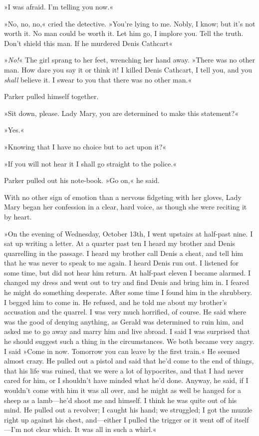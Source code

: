 »I was afraid. I'm telling you now.«

»No, no, no,« cried the detective. »You're lying to me. Nobly, I know; but it's not worth it. No man could be worth it. Let him go, I implore you. Tell the truth. Don't shield this man. If he murdered Denis Cathcart\longdash«

»\textit{No!}« The girl sprang to her feet, wrenching her hand away. »There was no other man. How dare you say it or think it! I killed Denis Cathcart, I tell you, and you \textit{shall} believe it. I swear to you that there was no other man.«

Parker pulled himself together.

»Sit down, please. Lady Mary, you are determined to make this statement?«

»Yes.«

»Knowing that I have no choice but to act upon it?«

»If you will not hear it I shall go straight to the police.«

Parker pulled out his note-book. »Go on,« he said.

With no other sign of emotion than a nervous fidgeting with her gloves, Lady Mary began her confession in a clear, hard voice, as though she were reciting it by heart.

»On the evening of Wednesday, October 13th, I went upstairs at half-past nine. I sat up writing a letter. At a quarter past ten I heard my brother and Denis quarrelling in the passage. I heard my brother call Denis a cheat, and tell him that he was never to speak to me again. I heard Denis run out. I listened for some time, but did not hear him return. At half-past eleven I became alarmed. I changed my dress and went out to try and find Denis and bring him in. I feared he might do something desperate. After some time I found him in the shrubbery. I begged him to come in. He refused, and he told me about my brother's accusation and the quarrel. I was very much horrified, of course. He said where was the good of denying anything, as Gerald was determined to ruin him, and asked me to go away and marry him and live abroad. I said I was surprised that he should suggest such a thing in the circumstances. We both became very angry. I said »Come in now.  Tomorrow you can leave by the first train.« He seemed almost crazy. He pulled out a pistol and said that he'd come to the end of things, that his life was ruined, that we were a lot of hypocrites, and that I had never cared for him, or I shouldn't have minded what he'd done. Anyway, he said, if I wouldn't come with him it was all over, and he might as well be hanged for a sheep as a lamb—he'd shoot me and himself. I think he was quite out of his mind. He pulled out a revolver; I caught his hand; we struggled; I got the muzzle right up against his chest, and—either I pulled the trigger or it went off of itself—I'm not clear which. It was all in such a whirl.«

